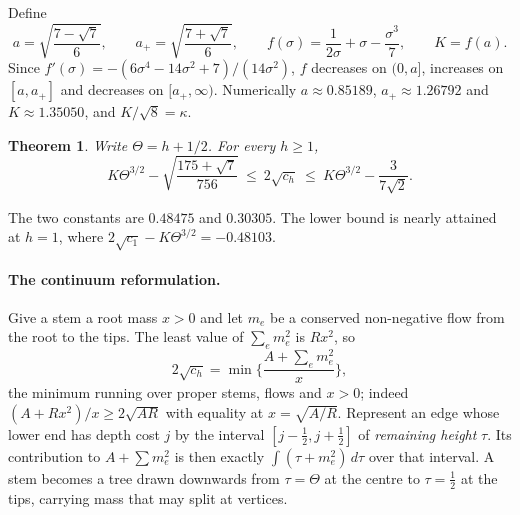 \documentclass[11pt,a4paper]{article}
\newtheorem{theorem}{Theorem}[section]
\theoremstyle{remark}
\begin{document}
Define
\begin{equation}
 a=\sqrt{\frac{7-\sqrt7}6},\qquad a_+=\sqrt{\frac{7+\sqrt7}6},\qquad
 f(\sigma)=\frac1{2\sigma}+\sigma-\frac{\sigma^3}7,\qquad K=f(a).
 \label{K}
\end{equation}
Since $f'(\sigma)=-(6\sigma^4-14\sigma^2+7)/(14\sigma^2)$, $f$ decreases on $(0,a]$, increases on $[a,a_+]$ and decreases on $[a_+,\infty)$. Numerically $a\approx0.85189$, $a_+\approx1.26792$ and $K\approx1.35050$, and $K/\sqrt8=\kappa$.

\begin{theorem}\label{mesh}
Write $\Theta=h+1/2$. For every $h\ge1$,
\[
 K\Theta^{3/2}-\sqrt{\frac{175+\sqrt7}{756}}
 \ \le\ 2\sqrt{c_h}\ \le\
 K\Theta^{3/2}-\frac{3}{7\sqrt2}.
\]
\end{theorem}
The two constants are $0.48475$ and $0.30305$. The lower bound is nearly attained at $h=1$, where $2\sqrt{c_1}-K\Theta^{3/2}=-0.48103$.

\paragraph{The continuum reformulation.} Give a stem a root mass $x>0$ and let $m_e$ be a conserved non-negative flow from the root to the tips. The least value of $\sum_em_e^2$ is $Rx^2$, so
\[
 2\sqrt{c_h}=\min\Big\{\frac{A+\sum_em_e^2}{x}\Big\},
\]
the minimum running over proper stems, flows and $x>0$; indeed $(A+Rx^2)/x\ge2\sqrt{AR}$ with equality at $x=\sqrt{A/R}$. Represent an edge whose lower end has depth cost $j$ by the interval $[j-\frac12,j+\frac12]$ of \emph{remaining height} $\tau$. Its contribution to $A+\sum m_e^2$ is then exactly $\int(\tau+m_e^2)\,d\tau$ over that interval. A stem becomes a tree drawn downwards from $\tau=\Theta$ at the centre to $\tau=\frac12$ at the tips, carrying mass that may split at vertices.
\end{document}
